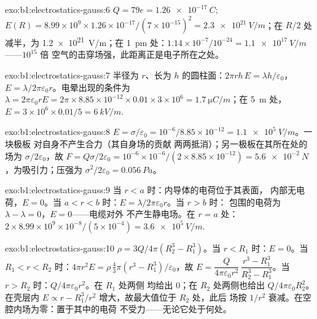 \begin{solution}{exo:b1:electrostatics-gauss:6}
$Q = 79e = \qty{1.26e-17}{C}$; $E(R) = 8.99 \times 10^9 \times 1.26 \times 10^{-17}/
(7 \times 10^{-15})^2 = \qty{2.3e21}{V/m}$；在 $R/2$ 处减半，为 \qty{1.2e21}{V/m}；在
\qty{1}{pm} 处：$1.14 \times 10^{-7}/10^{-24} = \qty{1.1e17}{V/m}$——$10^{15}$ 倍
空气的击穿场强，此距离正是电子所在之处。
\end{solution}

\begin{solution}{exo:b1:electrostatics-gauss:7}
半径为 $r$、长为 $h$ 的圆柱面：$2\pi rh\,E = \lambda h/\varepsilon_0$，$E =
\lambda/2\pi\varepsilon_0r$。电晕出现的条件为 $\lambda = 2\pi\varepsilon_0 rE = 2\pi \times 8.85 \times
10^{-12} \times 0.01 \times 3 \times 10^6 = \qty{1.7}{\micro C/m}$；在 \qty{5}{m} 处，
$E = 3 \times 10^6 \times 0.01/5 = \qty{6}{kV/m}$.
\end{solution}

\begin{solution}{exo:b1:electrostatics-gauss:8}
$E = \sigma/\varepsilon_0 = 10^{-6}/8.85 \times 10^{-12} = \qty{1.1e5}{V/m}$。一块极板
对自身不产生合力（其自身场的贡献
两两抵消）；另一极板在其所在处的场为 $\sigma/2\varepsilon_0$，故
$F = Q\sigma/2\varepsilon_0 = 10^{-6} \times 10^{-6}/(2 \times 8.85 \times 10^{-12}) =
\qty{5.6e-2}{N}$，为吸引力；压强为 $\sigma^2/2\varepsilon_0 = \qty{0.056}{Pa}$。
\end{solution}

\begin{solution}{exo:b1:electrostatics-gauss:9}
当 $r < a$ 时：内导体的电荷位于其表面，
内部无电荷，$E = 0$。当 $a < r < b$ 时：$E = \lambda/2\pi\varepsilon_0r$。当 $r > b$ 时：
包围的电荷为 $\lambda - \lambda = 0$，$E = 0$——电缆对外
不产生静电场。在 $r = a$ 处：$2 \times 8.99 \times 10^9 \times 10^{-8}/(5 \times 10^{-4}) =
\qty{3.6e5}{V/m}$.
\end{solution}

\begin{solution}{exo:b1:electrostatics-gauss:10}
$\rho = 3Q/4\pi(R_2^3 - R_1^3)$。当 $r < R_1$ 时：$E = 0$。当 $R_1 < r < R_2$ 时：$4\pi r^2E =
\rho\,\tfrac43\pi(r^3 - R_1^3)/\varepsilon_0$，故 $E = \dfrac{Q}{4\pi\varepsilon_0r^2}\,
\dfrac{r^3 - R_1^3}{R_2^3 - R_1^3}$。当 $r > R_2$ 时：$Q/4\pi\varepsilon_0r^2$。在 $R_1$ 处两侧
均给出 $0$；在 $R_2$ 处两侧也给出 $Q/4\pi\varepsilon_0R_2^2$。在壳层内 $E
\propto r - R_1^3/r^2$ 增大，故最大值位于 $R_2$ 处，此后
场按 $1/r^2$ 衰减。在空腔内场为零：置于其中的电荷
不受力——无论它处于何处。
\end{solution}

